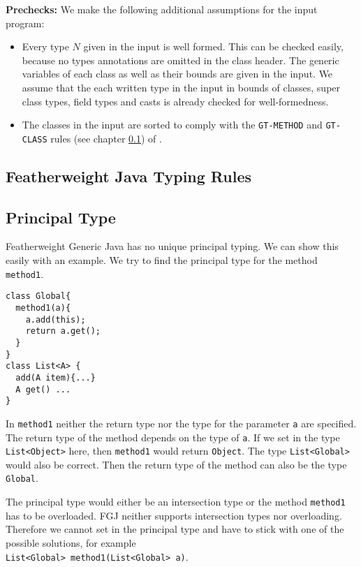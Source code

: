 \textbf{Prechecks:}
We make the following additional assumptions for the input program:
\begin{itemize}
\item Every type $N$ given in the input is well formed.
This can be checked easily, because no types annotations are omitted in the class header.
The generic variables of each class as well as their bounds are given in the input.
We assume that the each written type in the input in bounds of classes, super class types, field types and casts is already checked for well-formedness.
\item The classes in the input are sorted to comply with the \texttt{GT-METHOD} and \texttt{GT-CLASS} rules (see chapter \ref{chapter:type-rules}) of \TFGJ.
\end{itemize}

\subsection{Featherweight Java Typing Rules}\label{chapter:type-rules}


\subsection{Principal Type}
Featherweight Generic Java has no unique principal typing.
We can show this easily with an example.
We try to find the principal type for the method \texttt{method1}.
\begin{lstlisting}
class Global{
  method1(a){
    a.add(this);
    return a.get();
  }
}
class List<A> {
  add(A item){...}
  A get() ...
}
\end{lstlisting}
In \texttt{method1} neither the return type nor the type for the parameter \texttt{a} are specified.
The return type of the method depends on the type of \texttt{a}.
If we set in the type \texttt{List<Object>} here, then \texttt{method1} would return \texttt{Object}.
The type \texttt{List<Global>} would also be correct.
Then the return type of the method can also be the type \texttt{Global}.

The principal type would either be an intersection type or the method \texttt{method1} has to be overloaded.
FGJ neither supports intersection types nor overloading.
Therefore we cannot set in the principal type and have to stick with one of the possible solutions,
for example\\
\texttt{List<Global> method1(List<Global> a)}.

